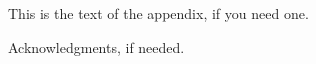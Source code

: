 \documentclass[preprint,10pt]{./bibs/sigplanconf}
\begin{document}
This is the text of the appendix, if you need one.

\acks

Acknowledgments, if needed.





\end{document}
